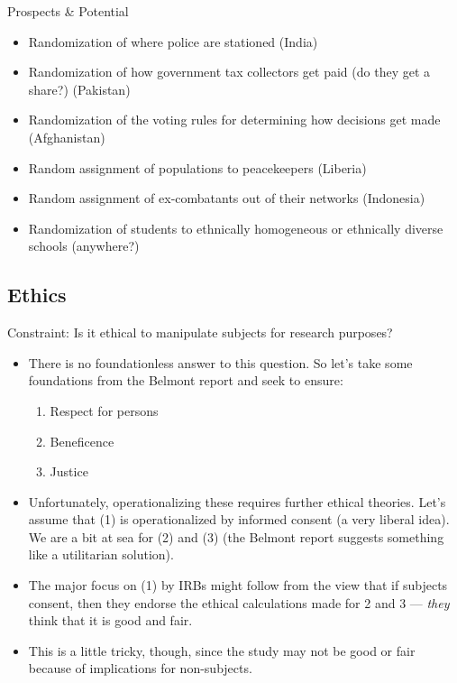 \documentclass[
  11pt,
  ignorenonframetext,
]{beamer}
\providecommand{\tightlist}{%
  \setlength{\itemsep}{0pt}\setlength{\parskip}{0pt}}\usepackage{longtable,booktabs,array}
\begin{document}
\begin{frame}{Prospects \& Potential}
\protect\hypertarget{prospects-potential}{}
\begin{itemize}
\tightlist
\item
  Randomization of where police are stationed (India)
\item
  Randomization of how government tax collectors get paid (do they get a
  share?) (Pakistan)
\item
  Randomization of the voting rules for determining how decisions get
  made (Afghanistan)
\item
  Random assignment of populations to peacekeepers (Liberia)
\item
  Random assignment of ex-combatants out of their networks (Indonesia)
\item
  Randomization of students to ethnically homogeneous or ethnically
  diverse schools (anywhere?)
\end{itemize}
\end{frame}

\hypertarget{ethics}{%
\subsection{\texorpdfstring{Ethics
\label{ethics}}{Ethics }}\label{ethics}}

\begin{frame}{Constraint: Is it ethical to manipulate subjects for
research purposes?}
\protect\hypertarget{constraint-is-it-ethical-to-manipulate-subjects-for-research-purposes}{}
\begin{itemize}
\item
  There is no foundationless answer to this question. So let's take some
  foundations from the Belmont report and seek to ensure:

  \begin{enumerate}
  \tightlist
  \item
    Respect for persons
  \item
    Beneficence
  \item
    Justice
  \end{enumerate}
\item
  Unfortunately, operationalizing these requires further ethical
  theories. Let's assume that (1) is operationalized by informed consent
  (a very liberal idea). We are a bit at sea for (2) and (3) (the
  Belmont report suggests something like a utilitarian solution).
\item
  The major focus on (1) by IRBs might follow from the view that if
  subjects consent, then they endorse the ethical calculations made for
  2 and 3 --- \emph{they} think that it is good and fair.
\item
  This is a little tricky, though, since the study may not be good or
  fair because of implications for non-subjects.
\end{itemize}
\end{frame}
\end{document}
